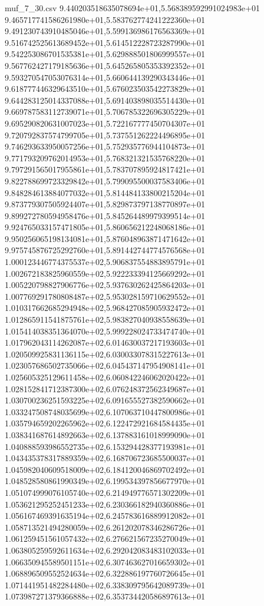 \begin{filecontents*}{muf_7_30.csv}
9.440203518635078694e+01,5.568389592991024983e+01
9.465717741586261980e+01,5.583762774241222360e+01
9.491230743910485046e+01,5.599136986176563369e+01
9.516742525613689452e+01,5.614512228723287990e+01
9.542253086701535381e+01,5.629888501806999557e+01
9.567762427179185636e+01,5.645265805353392352e+01
9.593270547053076314e+01,5.660644139290343446e+01
9.618777446329643510e+01,5.676023503542273829e+01
9.644283125014337088e+01,5.691403898035514430e+01
9.669787583112739071e+01,5.706785322696305229e+01
9.695290820631007023e+01,5.722167777450704307e+01
9.720792837574799705e+01,5.737551262224496895e+01
9.746293633950057256e+01,5.752935776944104873e+01
9.771793209762014953e+01,5.768321321535768220e+01
9.797291565017955861e+01,5.783707895924817421e+01
9.822788699723329842e+01,5.799095500037583406e+01
9.848284613884077032e+01,5.814484133800215204e+01
9.873779307505924407e+01,5.829873797138770897e+01
9.899272780594958476e+01,5.845264489979399514e+01
9.924765033157471805e+01,5.860656212248068186e+01
9.950256065198134081e+01,5.876048963871471642e+01
9.975745876725292760e+01,5.891442744774576568e+01
1.000123446774375537e+02,5.906837554883895791e+01
1.002672183825960559e+02,5.922233394125669292e+01
1.005220798827906776e+02,5.937630262425864203e+01
1.007769291780808487e+02,5.953028159710629552e+01
1.010317662685294948e+02,5.968427085905932472e+01
1.012865911541875761e+02,5.983827040938558639e+01
1.015414038351364070e+02,5.999228024733474740e+01
1.017962043114262087e+02,6.014630037217193603e+01
1.020509925831136115e+02,6.030033078315227613e+01
1.023057686502735066e+02,6.045437147954908141e+01
1.025605325129611458e+02,6.060842246062020422e+01
1.028152841712387300e+02,6.076248372562349687e+01
1.030700236251593225e+02,6.091655527382590662e+01
1.033247508748035699e+02,6.107063710447800986e+01
1.035794659202265962e+02,6.122472921684584435e+01
1.038341687614892663e+02,6.137883161018999090e+01
1.040888593986552735e+02,6.153294428377193981e+01
1.043435378317889359e+02,6.168706723685500037e+01
1.045982040609518009e+02,6.184120046869702492e+01
1.048528580861990349e+02,6.199534397856677970e+01
1.051074999076105740e+02,6.214949776571302209e+01
1.053621295252451233e+02,6.230366182940360886e+01
1.056167469391635194e+02,6.245783616889912082e+01
1.058713521494280059e+02,6.261202078346286726e+01
1.061259451561057432e+02,6.276621567235270049e+01
1.063805259592611634e+02,6.292042083483102033e+01
1.066350945589501151e+02,6.307463627016659302e+01
1.068896509552524634e+02,6.322886197760726645e+01
1.071441951482284480e+02,6.338309795642089739e+01
1.073987271379366888e+02,6.353734420586897613e+01

\end{filecontents*}
